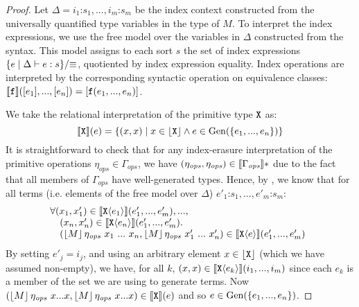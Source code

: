 \begin{proof}
  Let $\Delta = i_1\mathord:s_1,...,i_m\mathord:s_m$ be the index
  context constructed from the universally quantified type variables
  in the type of $M$.  To interpret the index expressions, we use the
  free model over the variables in $\Delta$ constructed from the
  syntax. This model assigns to each sort $s$ the set of index
  expressions $\{ e \mathrel| \Delta \vdash e : s \}/\mathord\equiv$,
  quotiented by index expression equality. Index operations are
  interpreted by the corresponding syntactic operation on equivalence
  classes: $\llbracket \texttt{\textup{f}} \rrbracket([e_1],...,[e_n]) =
  [\texttt{\textup{f}}(e_1,...,e_n)]$.

  We take the relational interpretation of the primitive type
  $\textup{\texttt{X}}$ as:
  \begin{displaymath}
    \llbracket \textup{\texttt{X}} \rrbracket(e) = \{ (x,x) \mathrel| x \in \left\lfloor \textup{\texttt{X}} \right\rfloor \land e \in \mathrm{Gen}(\{e_1,...,e_n\}) \}
  \end{displaymath}
  It is straightforward to check that for any index-erasure
  interpretation of the primitive operations $\eta_{\mathit{ops}} \in
  \Gamma_{\mathit{ops}}$, we have $(\eta_{\mathit{ops}},
  \eta_{\mathit{ops}}) \in \llbracket \Gamma_{\mathit{ops}} \rrbracket*$ due to the
  fact that all members of $\Gamma_{\mathit{ops}}$ have well-generated
  types. Hence, by , we know that for all
  terms (i.e. elements of the free model over $\Delta$)
  $e'_1\mathord:s_1,...,e'_m\mathord:s_m$:
  \begin{displaymath}%
    \begin{array}{@{}l}
      \forall (x_1,x_1') \in \rsem{\tyPrim{X}{e_1}}(e'_1,...,e'_m), ..., \\
      \quad(x_n, x'_n) \in \rsem{\tyPrim{X}{e_n}}(e'_1,...,e'_m). \\
      \quad (\tmSem{M} \eta_{\mathit{ops}}~x_1 ~...~x_n, \tmSem{M}\eta_{\mathit{ops}}~x'_1~...~x'_n) \in \rsem{\tyPrim{X}{e}}(e'_1,...,e'_m)
    \end{array}
  \end{displaymath}
  By setting $e'_j = i_j$, and using an arbitrary element $x \in
  \left\lfloor \textup{\texttt{X}} \right\rfloor$ (which we have assumed non-empty), we have,
  for all $k$, $(x,x) \in \llbracket \textup{\texttt{X}}\langle e_k \rangle \rrbracket(i_1,...,i_m)$ since
  each $e_k$ is a member of the set we are using to generate
  terms. Now $(\left\lfloor{M}\right\rfloor \eta_{\mathit{ops}}~x...x,
  \left\lfloor{M}\right\rfloor\eta_{\mathit{ops}}~x...x) \in \llbracket \textup{\texttt{X}} \rrbracket(e)$ and
  so $e \in \mathrm{Gen}(\{e_1,...,e_n\})$.
\end{proof}

